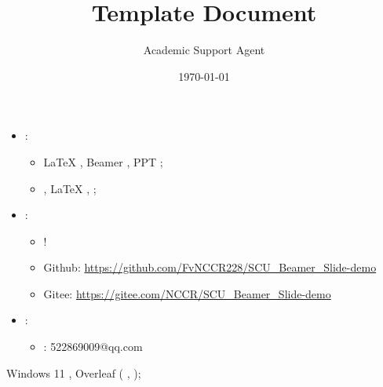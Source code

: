 \documentclass{article}
\title{Template Document}
\author{Academic Support Agent}
\date{\today}
\begin{document}
\maketitle

%		

\section{ }
\subsection{ }
\begin{frame}{ }%
	\begin{itemize}
		\item  :
		\begin{itemize}
			\item  \LaTeX{}  ,  Beamer ,  PPT ;
			\item  ,  \LaTeX{}  ,  ;
		\end{itemize}
		\item  :
		\begin{itemize}
			\item  !
			\item Github: {\color{BSblue}\url{https://github.com/FvNCCR228/SCU_Beamer_Slide-demo}}
			\item Gitee: \color{BSblue}\url{https://gitee.com/NCCR/SCU_Beamer_Slide-demo}
		\end{itemize}
		\item  :
		\begin{itemize}
			\item  : 522869009@qq.com
		\end{itemize}
	\end{itemize}
	 Windows 11 , Overleaf ( ,  );
\end{frame}
\end{document}
